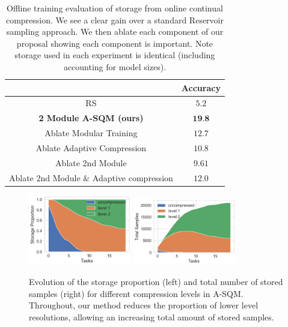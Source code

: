 \documentclass[colorinlistoftodos]{article} %
\newcommand\mynotesEB[1]{\textcolor{red}{#1}}
\begin{document}

\begin{table}
    \centering
    \begin{tabular}{c|c}
&Accuracy \\\hline
    RS &$5.2$\\
    \textbf{2 Module A-SQM (ours)} & $\textbf{19.8}$ \\\hline
    Ablate Modular Training & $12.7$ \\
    Ablate Adaptive Compression  & $10.8$ \\ %
    Ablate 2nd Module & $9.61$ \\
    Ablate 2nd Module \& Adaptive compression & $12.0$  \\ \hline

\end{tabular}
\caption{Offline training evaluation of storage from online continual compression. We see a clear gain over a standard Reservoir sampling approach. We then ablate each component of our proposal showing each component is important. Note storage used in each experiment is identical (including accounting for model sizes).}\label{tab:offline}
\end{table}


\begin{figure}
    \centering
    \includegraphics[width=0.4\textwidth]{figs/adaptative_buffer_prop.png}
    \includegraphics[width=0.4\textwidth]{figs/adaptative_buffer_tot_samples.png}
    \caption{Evolution of the storage proportion (left) and total number of stored samples (right) for different compression levels in A-SQM. Throughout, our method reduces the proportion of lower level resolutions, allowing an increasing total amount of stored samples.}
    \label{fig:adaptive}
\end{figure}
\end{document}
